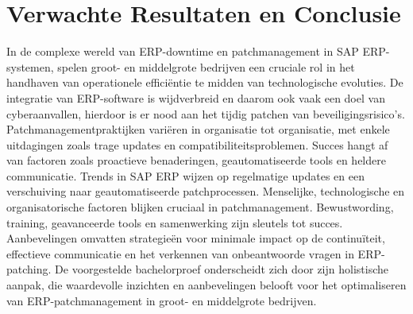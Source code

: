 \section{Verwachte Resultaten en Conclusie}%
\label{sec:verwachte-resultaten}

In de complexe wereld van ERP-downtime en patchmanagement in SAP ERP-systemen, spelen groot- en middelgrote bedrijven een cruciale rol in het handhaven van operationele efficiëntie te midden van technologische evoluties. De integratie van ERP-software is wijdverbreid en daarom ook vaak een doel van cyberaanvallen, hierdoor is er nood aan het tijdig patchen van beveiligingsrisico’s. 
Patchmanagementpraktijken variëren in organisatie tot organisatie, met enkele uitdagingen zoals trage updates en compatibiliteitsproblemen. Succes hangt af van factoren zoals proactieve benaderingen, geautomatiseerde tools en heldere communicatie.
Trends in SAP ERP wijzen op regelmatige updates en een verschuiving naar geautomatiseerde patchprocessen. Menselijke, technologische en organisatorische factoren blijken cruciaal in patchmanagement. Bewustwording, training, geavanceerde tools en samenwerking zijn sleutels tot succes. Aanbevelingen omvatten strategieën voor minimale impact op de continuïteit, effectieve communicatie en het verkennen van onbeantwoorde vragen in ERP-patching.
De voorgestelde bachelorproef onderscheidt zich door zijn holistische aanpak, die waardevolle inzichten en aanbevelingen belooft voor het optimaliseren van ERP-patchmanagement in groot- en middelgrote bedrijven.
